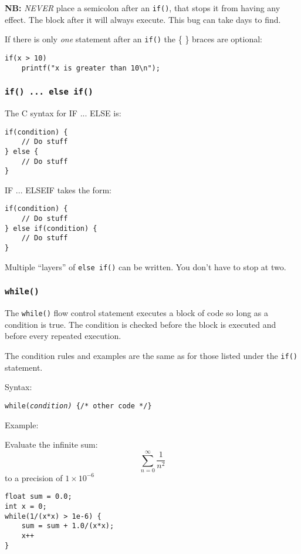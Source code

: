 \documentclass{lab}
\begin{document}
\begin{multicols}{2}
\textbf{NB:} \textit{NEVER} place a semicolon after an \texttt{if()}, that stops it from having any effect. The block after it will always execute. This bug can take days to find.

If there is only \textit{one} statement after an \texttt{if()} the \{ \} braces are optional:

\begin{lstlisting}[style=CStyle]
if(x > 10) 
	printf("x is greater than 10\n");
\end{lstlisting}

\subsubsection{\texttt{if() ... else if()}}

The C syntax for IF ... ELSE is:

\begin{lstlisting}[style=CStyle]
if(condition) {
	// Do stuff
} else {
	// Do stuff
}
\end{lstlisting}

IF ... ELSEIF takes the form:

\begin{lstlisting}[style=CStyle]
if(condition) {
	// Do stuff
} else if(condition) {
	// Do stuff
}
\end{lstlisting}

Multiple ``layers'' of \texttt{else if()} can be written. You don't have to stop at two.

\subsubsection{\texttt{while()}}

The \texttt{while()} flow control statement executes a block of code so long as a condition is true. The condition is checked before the block is executed and before every repeated execution.

The condition rules and examples are the same as for those listed under the \texttt{if()} statement.

Syntax:

\texttt{while(\textit{condition)} \{/* other code */\}}

Example:

Evaluate the infinite sum:
\begin{equation}
\sum_{n=0}^{\infty} \frac{1}{n^2}
\end{equation}
to a precision of $1 \times 10^{-6}$
\begin{lstlisting}[style=CStyle]
float sum = 0.0;
int x = 0;
while(1/(x*x) > 1e-6) {
	sum = sum + 1.0/(x*x);
	x++
}
\end{lstlisting}


\end{multicols}
\end{document}
